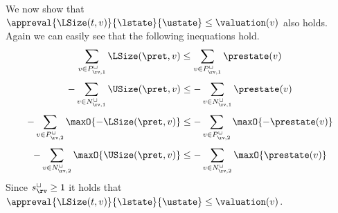 We now show that $\appreval{\LSize(t, v)}{\lstate}{\ustate} \leq \valuation(v)$ also holds.
Again we can easily see that the following inequations hold.
\[ \sum_{v \in P_{\rv,1}^\sqcup} \LSize(\pret, v) \leq \sum_{v \in P_{\rv,1}^\sqcup} \prestate(v) \]
\[ - \sum_{v \in N_{\rv,1}^\sqcup} \USize(\pret, v) \leq - \sum_{v \in N_{\rv,1}^\sqcup} \prestate(v) \]
\[ - \sum_{v \in P_{\rv,2}^\sqcup} \maxO{-\LSize(\pret, v)} \leq - \sum_{v \in P_{\rv,2}^\sqcup} \maxO{-\prestate(v)} \]
\[ - \sum_{v \in N_{\rv,2}^\sqcup} \maxO{\USize(\pret, v)} \leq - \sum_{v \in N_{\rv,2}^\sqcup} \maxO{\prestate(v)} \]
Since $s^\sqcup_\rv \geq 1$ it holds that $\appreval{\LSize(t, v)}{\lstate}{\ustate} \leq \valuation(v)$.
